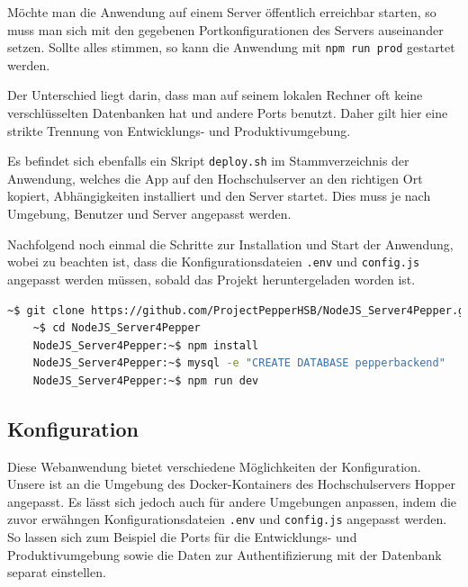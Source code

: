 Möchte man die Anwendung auf einem Server öffentlich erreichbar starten, so muss man sich mit den gegebenen Portkonfigurationen des Servers auseinander setzen. Sollte alles stimmen, so kann die Anwendung mit \verb|npm run prod| gestartet werden.

Der Unterschied liegt darin, dass man auf seinem lokalen Rechner oft keine verschlüsselten Datenbanken hat und andere Ports benutzt. Daher gilt hier eine strikte Trennung von Entwicklungs- und Produktivumgebung.

Es befindet sich ebenfalls ein Skript \verb|deploy.sh| im Stammverzeichnis der Anwendung, welches die App auf den Hochschulserver an den richtigen Ort kopiert, Abhängigkeiten installiert und den Server startet. Dies muss je nach Umgebung, Benutzer und Server
angepasst werden.

Nachfolgend noch einmal die Schritte zur Installation und Start der Anwendung, wobei zu beachten ist,
dass die Konfigurationsdateien \verb|.env| und \verb|config.js| angepasst werden müssen, sobald das Projekt heruntergeladen
worden ist.\\

\begin{lstlisting}[language=Bash, basicstyle=\footnotesize,xleftmargin=-.1in,caption={Installation und Starten der Webanwendung}]
    ~$ git clone https://github.com/ProjectPepperHSB/NodeJS_Server4Pepper.git 
    ~$ cd NodeJS_Server4Pepper
    NodeJS_Server4Pepper:~$ npm install
    NodeJS_Server4Pepper:~$ mysql -e "CREATE DATABASE pepperbackend"
    NodeJS_Server4Pepper:~$ npm run dev
\end{lstlisting}
\vspace{.3cm}

\subsection*{Konfiguration}
\label{sec:nodechapter-config}
Diese Webanwendung bietet verschiedene Möglichkeiten der Konfiguration. Unsere ist an die Umgebung des Docker-Kontainers
des Hochschulservers Hopper angepasst. Es lässt sich jedoch auch für andere Umgebungen anpassen, indem die zuvor erwähngen Konfigurationsdateien \verb|.env| und \verb|config.js| angepasst werden. So lassen sich zum Beispiel die Ports für die Entwicklungs- und Produktivumgebung sowie die Daten zur Authentifizierung mit der Datenbank separat einstellen.\\


